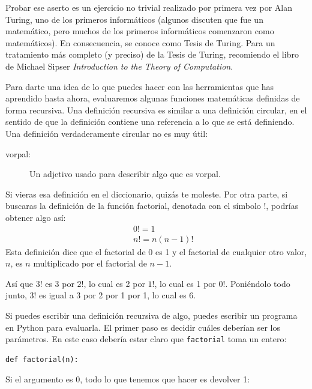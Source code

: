 \documentclass[10pt]{book}
\begin{document}
Probar ese aserto es un ejercicio no trivial realizado por primera vez por Alan
Turing, uno de los primeros informáticos (algunos discuten que
fue un matemático, pero muchos de los primeros informáticos comenzaron como
matemáticos).  En consecuencia, se conoce como Tesis de Turing.
Para un tratamiento más completo (y preciso) de la Tesis de Turing,
recomiendo el libro de Michael Sipser {\em Introduction to the
Theory of Computation}.

Para darte una idea de lo que puedes hacer con las herramientas que has aprendido
hasta ahora, evaluaremos algunas funciones matemáticas definidas de forma
recursiva.  Una definición recursiva es similar a una definición
circular, en el sentido de que la definición contiene una referencia a lo que
se está definiendo.  Una definición verdaderamente circular no es muy
útil:

\begin{description}

\item[vorpal:] Un adjetivo usado para describir algo que es vorpal.

\end{description}

Si vieras esa definición en el diccionario, quizás te moleste. Por
otra parte, si buscaras la definición de la función
factorial, denotada con el símbolo $!$, podrías obtener algo
así:
%
\begin{eqnarray*}
&&  0! = 1 \\
&&  n! = n (n-1)!
\end{eqnarray*}
%
Esta definición dice que el factorial de 0 es 1 y el factorial de
cualquier otro valor, $n$, es $n$ multiplicado por el factorial de $n-1$.

Así que $3!$ es 3 por $2!$, lo cual es 2 por $1!$, lo cual es 1 por
$0!$. Poniéndolo todo junto, $3!$ es igual a 3 por 2 por 1 por 1,
lo cual es 6.

Si puedes escribir una definición recursiva de algo, puedes
escribir un programa en Python para evaluarla.  El primer paso es decidir
cuáles deberían ser los parámetros.  En este caso debería estar claro
que {\tt factorial} toma un entero:

\begin{verbatim}
def factorial(n):
\end{verbatim}
%
Si el argumento es 0, todo lo que tenemos que hacer es devolver 1:
\end{document}
